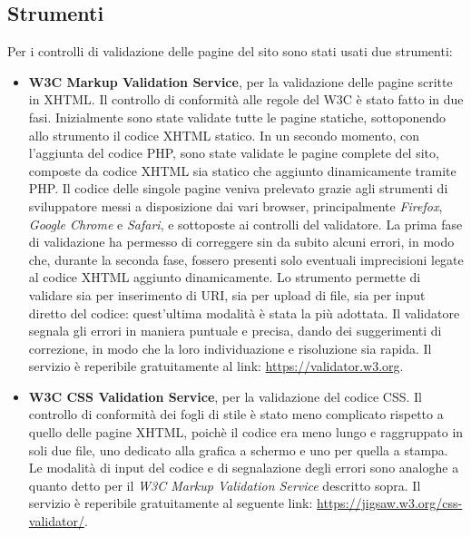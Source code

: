 \subsection{Strumenti}
\label{validazione-strumenti}
Per i controlli di validazione delle pagine del sito sono stati usati due strumenti:
\begin{itemize}
	\item \textbf{W3C Markup Validation Service}, per la validazione delle pagine scritte in XHTML. Il controllo di conformità alle regole del W3C è stato fatto in due fasi. Inizialmente sono state validate tutte le pagine statiche, sottoponendo allo strumento il codice XHTML statico. In un secondo momento, con l'aggiunta del codice PHP, sono state validate le pagine complete del sito, composte da codice XHTML sia statico che aggiunto dinamicamente tramite PHP. Il codice delle singole pagine veniva prelevato grazie agli strumenti di sviluppatore messi a disposizione dai vari browser, principalmente \textit{Firefox}, \textit{Google Chrome} e \textit{Safari}, e sottoposte ai controlli del validatore. La prima fase di validazione ha permesso di correggere sin da subito alcuni errori, in modo che, durante la seconda fase, fossero presenti solo eventuali imprecisioni legate al codice XHTML aggiunto dinamicamente. Lo strumento permette di validare sia per inserimento di URI, sia per upload di file, sia per input diretto del codice: quest'ultima modalità è stata la più adottata. Il validatore segnala gli errori in maniera puntuale e precisa, dando dei suggerimenti di correzione, in modo che la loro individuazione e risoluzione sia rapida. Il servizio è reperibile gratuitamente al link: \url{https://validator.w3.org}.
	
	\item \textbf{W3C CSS Validation Service}, per la validazione del codice CSS. Il controllo di conformità dei fogli di stile è stato meno complicato rispetto a quello delle pagine XHTML, poichè il codice era meno lungo e raggruppato in soli due file, uno dedicato alla grafica a schermo e uno per quella a stampa. Le modalità di input del codice e di segnalazione degli errori sono analoghe a quanto detto per il \textit{W3C Markup Validation Service} descritto sopra. Il servizio è reperibile gratuitamente al seguente link: \url{https://jigsaw.w3.org/css-validator/}.
\end{itemize}